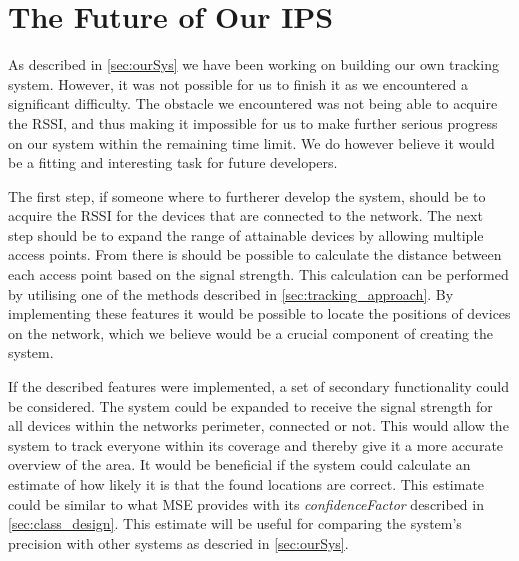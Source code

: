 \section{The Future of Our IPS}\label{sec:futureSystem}
As described in \cref{sec:ourSys} we have been working on building our own tracking system. However, it was not possible for us to finish it as we encountered a significant difficulty. The obstacle we encountered was not being able to acquire the RSSI, and thus making it impossible for us to make further serious progress on our system within the remaining time limit. We do however believe it would be a fitting and interesting task for future developers.

The first step, if someone where to furtherer develop the system, should be to acquire the RSSI for the devices that are connected to the network. The next step should be to expand the range of attainable devices by allowing multiple access points. From there is should be possible to calculate the distance between each access point based on the signal strength. This calculation can be performed by utilising one of the methods described in \cref{sec:tracking_approach}. By implementing these features it would be possible to locate the positions of devices on the network, which we believe would be a crucial component of creating the system.

If the described features were implemented, a set of secondary functionality could be considered. The system could be expanded to receive the signal strength for all devices within the networks perimeter, connected or not. This would allow the system to track everyone within its coverage and thereby give it a more accurate overview of the area.
It would be beneficial if the system could calculate an estimate of how likely it is that the found locations are correct. This estimate could be similar to what MSE provides with its \textit{confidenceFactor} described in \cref{sec:class_design}. This estimate will be useful for comparing the system's precision with other systems as descried in \cref{sec:ourSys}.